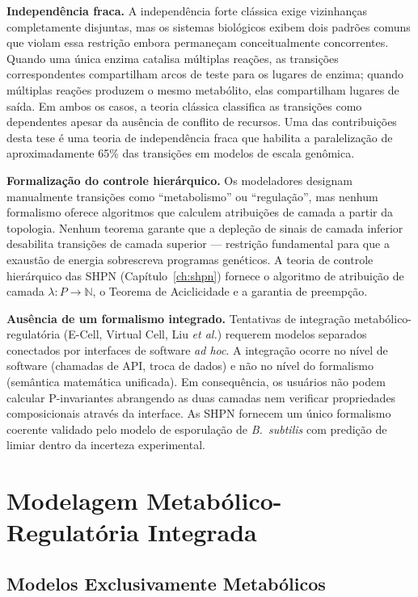 \textbf{Independência fraca.} A independência forte
clássica exige vizinhanças completamente disjuntas, mas os sistemas biológicos
exibem dois padrões comuns que violam essa restrição embora permaneçam
conceitualmente concorrentes. Quando uma única enzima catalisa múltiplas reações,
as transições correspondentes compartilham arcos de teste para os lugares de
enzima; quando múltiplas reações produzem o mesmo metabólito, elas compartilham
lugares de saída. Em ambos os casos, a teoria clássica classifica as transições
como dependentes apesar da ausência de conflito de recursos. Uma das contribuições
desta tese é uma teoria de independência fraca que habilita a paralelização de
aproximadamente 65\% das transições em modelos de escala genômica.

\textbf{Formalização do controle hierárquico.} Os
modeladores designam manualmente transições como ``metabolismo'' ou ``regulação'',
mas nenhum formalismo oferece algoritmos que calculem atribuições de camada a
partir da topologia. Nenhum teorema garante que a depleção de sinais de camada
inferior desabilita transições de camada superior --- restrição fundamental para
que a exaustão de energia sobrescreva programas genéticos. A teoria de controle
hierárquico das SHPN (Capítulo~\ref{ch:shpn}) fornece o algoritmo de atribuição
de camada $\lambda: P \to \mathbb{N}$, o Teorema de Aciclicidade e a garantia de
preempção.

\textbf{Ausência de um formalismo integrado.} Tentativas de
integração metabólico-regulatória (E-Cell, Virtual Cell, Liu \emph{et al.})
requerem modelos separados conectados por interfaces de software \textit{ad hoc}.
A integração ocorre no nível de software (chamadas de API, troca de dados) e não
no nível do formalismo (semântica matemática unificada). Em consequência, os
usuários não podem calcular P-invariantes abrangendo as duas camadas nem
verificar propriedades composicionais através da interface. As SHPN fornecem um
único formalismo coerente validado pelo modelo de esporulação de
\textit{B.~subtilis} com predição de limiar dentro da incerteza experimental.

\section{Modelagem Metabólico-Regulatória Integrada}
\label{sec:integracao}

\subsection{Modelos Exclusivamente Metabólicos}
\label{subsec:apenas-meta}

